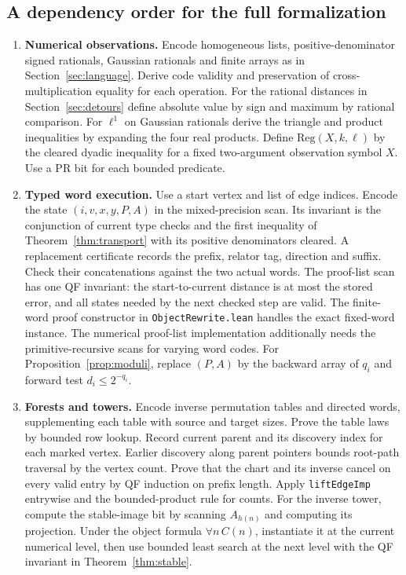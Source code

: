 \subsection{A dependency order for the full formalization}
\begin{enumerate}[leftmargin=*,itemsep=4pt]
\item \textbf{Numerical observations.} Encode homogeneous lists, positive-denominator signed rationals, Gaussian rationals and finite arrays as in Section~\ref{sec:language}. Derive code validity and preservation of cross-multiplication equality for each operation. For the rational distances in Section~\ref{sec:detours} define absolute value by sign and maximum by rational comparison. For $\ell^1$ on Gaussian rationals derive the triangle and product inequalities by expanding the four real products. Define $\mathrm{Reg}(X,k,\ell)$ by the cleared dyadic inequality for a fixed two-argument observation symbol $X$. Use a PR bit for each bounded predicate.
\item \textbf{Typed word execution.} Use a start vertex and list of edge indices. Encode the state $(i,v,x,y,P,A)$ in the mixed-precision scan. Its invariant is the conjunction of current type checks and the first inequality of Theorem~\ref{thm:transport} with its positive denominators cleared. A replacement certificate records the prefix, relator tag, direction and suffix. Check their concatenations against the two actual words. The proof-list scan has one QF invariant: the start-to-current distance is at most the stored error, and all states needed by the next checked step are valid. The finite-word proof constructor in \texttt{ObjectRewrite.lean} handles the exact fixed-word instance. The numerical proof-list implementation additionally needs the primitive-recursive scans for varying word codes. For Proposition~\ref{prop:moduli}, replace $(P,A)$ by the backward array of $q_i$ and forward test $d_i\le2^{-q_i}$.
\item \textbf{Forests and towers.} Encode inverse permutation tables and directed words, supplementing each table with source and target sizes. Prove the table laws by bounded row lookup. Record current parent and its discovery index for each marked vertex. Earlier discovery along parent pointers bounds root-path traversal by the vertex count. Prove that the chart and its inverse cancel on every valid entry by QF induction on prefix length. Apply \texttt{liftEdgeImp} entrywise and the bounded-product rule for counts. For the inverse tower, compute the stable-image bit by scanning $A_{h(n)}$ and computing its projection. Under the object formula $\forall n\,C(n)$, instantiate it at the current numerical level, then use bounded least search at the next level with the QF invariant in Theorem~\ref{thm:stable}.

\end{enumerate}
